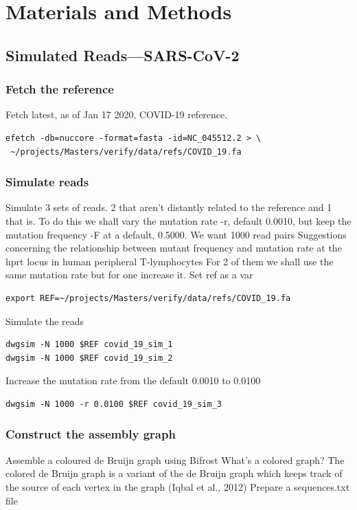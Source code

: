 \documentclass[a4paper]{article}
\begin{document}
\section{Materials and Methods}
\label{sec:org97d8c45}
\subsection{Simulated Reads—SARS-CoV-2}
\label{sec:orga206ae5}
\subsubsection{Fetch the reference}
\label{sec:org4bb5c6c}
Fetch latest, as of Jan 17 2020, COVID-19 reference.

\begin{verbatim}
efetch -db=nuccore -format=fasta -id=NC_045512.2 > \
 ~/projects/Masters/verify/data/refs/COVID_19.fa
\end{verbatim}

\subsubsection{Simulate reads}
\label{sec:org73525bb}
Simulate 3 sets of reads. 2 that aren’t distantly related to the reference and 1 that is.
To do this we shall vary the mutation rate -r, default 0.0010, but keep the mutation frequency -F at a default, 0.5000. We want 1000 read pairs
Suggestions concerning the relationship between mutant frequency and mutation rate at the hprt locus in human peripheral T-lymphocytes
For 2 of them we shall use the same mutation rate but for one increase it.
Set ref as a var


\begin{verbatim}
export REF=~/projects/Masters/verify/data/refs/COVID_19.fa
\end{verbatim}

Simulate the reads
\begin{verbatim}
dwgsim -N 1000 $REF covid_19_sim_1
dwgsim -N 1000 $REF covid_19_sim_2
\end{verbatim}

Increase the mutation rate from the default 0.0010 to 0.0100

\begin{verbatim}
dwgsim -N 1000 -r 0.0100 $REF covid_19_sim_3
\end{verbatim}

\subsubsection{Construct the assembly graph}
\label{sec:org1660648}
Assemble a coloured de Bruijn graph using Bifrost
What’s a colored graph? The colored de Bruijn graph is a variant of the de Bruijn graph which keeps track of the source of each vertex in the graph (Iqbal et al., 2012)
Prepare a sequences.txt file
\end{document}
